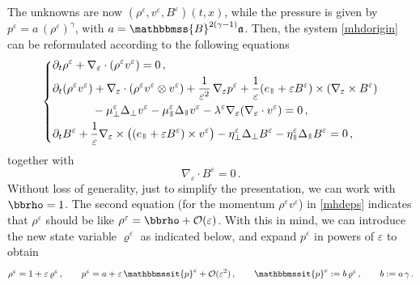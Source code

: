\documentclass[11pt,reqno]{amsart}
\newcommand{\myparallel}{{\mkern3mu\vphantom{\perp}\vrule depth 0pt\mkern2mu\vrule depth 0pt\mkern3mu}}
\begin{document}
The unknowns are now $ (\rho^\varepsilon, v^\varepsilon , B^\varepsilon ) (t,x)$, while the pressure is given by $p^\varepsilon = a \, (\rho^\varepsilon)^\gamma $, with $a= \mathbbmss{B}^{2(\gamma-1)}\mathfrak{a}$. Then, the system \eqref{mhdorigin} can be reformulated according to the following equations
\begin{equation}
\left \{
\begin{aligned}
&\partial_t \rho^\varepsilon + \nabla_\varepsilon \cdot (\rho^\varepsilon v^\varepsilon) = 0 \,, \\
&\partial_t (\rho^\varepsilon v^\varepsilon) + \nabla_\varepsilon \cdot (\rho^\varepsilon v^\varepsilon \otimes v^\varepsilon)
  + \frac{1}{\varepsilon^2} \, \nabla_\varepsilon {p}^\varepsilon + \frac{1}{\varepsilon} (e_\myparallel + \varepsilon B^\varepsilon) \times (\nabla_\varepsilon \times B^\varepsilon ) \\
& \qquad\quad \ \, - \mu_\perp^\varepsilon \Delta_\perp v^\varepsilon - \mu_\myparallel^\varepsilon \Delta_\myparallel v^\varepsilon
- \lambda^\varepsilon \nabla_\varepsilon (\nabla_\varepsilon \cdot v^\varepsilon ) =0 \,, \\
&\partial_t B^\varepsilon + \frac{1}{\varepsilon} \nabla_\varepsilon \times \big( (e_\myparallel + \varepsilon B^\varepsilon ) \times v^\varepsilon \big)
- \eta_\perp^\varepsilon \Delta_\perp B^\varepsilon - \eta_\myparallel^\varepsilon \Delta_\myparallel B^\varepsilon =0\, ,
\end{aligned}
\right.
\label{mhdeps}
\end{equation}
together with
\begin{equation}
  \label{divbesp}
 \nabla_\varepsilon \cdot B^\varepsilon = 0 \,.
\end{equation}
Without loss of generality, just to simplify the presentation, we can work with $  \bbrho = 1 $. The second equation (for the momentum $ \rho^\varepsilon v^\varepsilon $) in \eqref{mhdeps} indicates that $ \rho^\varepsilon $ should be like $ \rho^\varepsilon = \bbrho + \mathcal{O}(\varepsilon)$. With this in mind, we can introduce the new state variable $ \varrho^\varepsilon $ as indicated below, and expand ${p}^\varepsilon $ in powers of $ \varepsilon $ to obtain
\begin{equation}
  \label{expanesp}
\rho^\varepsilon = 1 + \varepsilon \, \varrho^\varepsilon \, , \qquad {p}^\varepsilon = a + \varepsilon \, \mathbbmssit{p}^\varepsilon  + \mathcal{O}(\varepsilon^2) \, , \qquad  \mathbbmssit{p}^\varepsilon := b \, \varrho^\varepsilon\, , \qquad b := a \, \gamma \,.
\end{equation}
\end{document}
